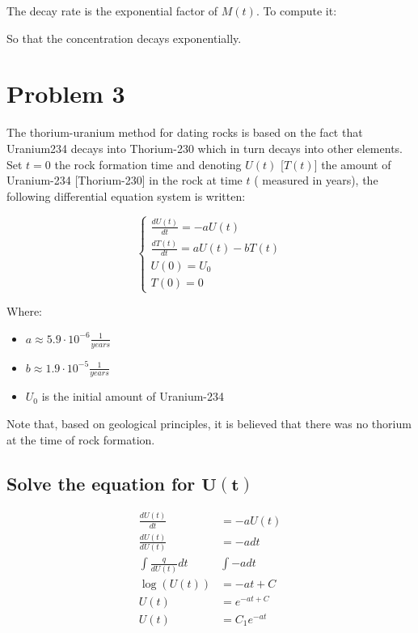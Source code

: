   The decay rate is the exponential factor of $M(t)$.
  To compute it:

  So that the concentration decays exponentially.

\section{Problem 3}
The thorium-uranium method for dating rocks is based on the fact that Uranium234 decays into Thorium-230 which in turn decays into other elements.
Set $t = 0$ the rock formation time and denoting $U(t)$ [$T(t)$] the amount of Uranium-234 [Thorium-230] in the rock at time $t$ ( measured in years), the following differential equation system is written:

$$\begin{cases}
  \frac{dU(t)}{dt} = -aU(t) \\
  \frac{dT(t)}{dt} = aU(t) - bT(t) \\
  U(0) = U_0\\
  T(0) = 0
\end{cases}$$

Where:

\begin{multicols}{2}
  \begin{itemize}
    \item $a \approx 5.9 \cdot 10^{-6}\frac{1}{years}$
    \item $b \approx 1.9 \cdot 10^{-5}\frac{1}{years}$
    \item $U_0$ is the initial amount of Uranium-234
  \end{itemize}
\end{multicols}



Note that, based on geological principles, it is believed that there was no thorium at the time of rock formation.

  \subsection{Solve the equation for $\mathbf{U(t)}$}

  \begin{align*}
    \frac{dU(t)}{dt} &= -aU(t) \\
    \frac{dU(t)}{dU(t)} &= -adt \\
    \int \frac{q}{dU(t)}dt & \int -adt \\
    \log(U(t)) &= -at + C \\
    U(t) &= e^{-at + C}\\
    U(t) &= C_1e^{-at}
  \end{align*}

